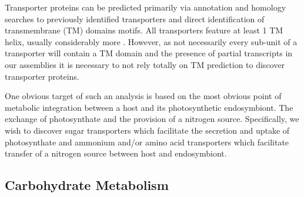 

Transporter proteins can be predicted  
primarily via annotation and homology searches to previously
identified transporters \citep{Saier2006,Saier2009,Saier2014} 
and direct identification of transmembrane (TM) domains motifs. 
All transporters feature at least 1 TM helix, usually considerably
more \citep{VonHeijne2006}.  However, as not necessarily every sub-unit of
a transporter will contain a TM domain and the presence of partial transcripts
in our assemblies it is necessary to not rely totally on TM prediction to discover
transporter proteins.





One obvious target of such an analysis is based on the most obvious point
of metabolic integration between a host and its photosynthetic endosymbiont.
The exchange of photosynthate and the provision of a nitrogen source.
Specifically, we wish to discover sugar transporters which facilitate the
secretion and uptake of photosynthate and ammonium and/or amino acid transporters
which facilitate transfer of a nitrogen source between host and endosymbiont.

\subsection{Carbohydrate Metabolism}



